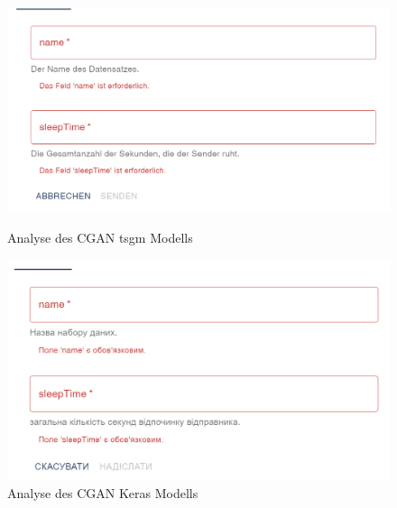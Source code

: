 \begin{figure}[ht]
    \centering
    \begin{minipage}{0.5\textwidth}
        \centering
        \includegraphics[width=\textwidth]{includes/figures/new_version/rsjf_translation_1.png}
        \caption{Analyse des CGAN tsgm Modells}
        \label{fig:rsjf_translation_1}
    \end{minipage}\hfill
    \begin{minipage}{0.5\textwidth}
        \centering
        \includegraphics[width=\textwidth]{includes/figures/new_version/rsjf_translation_2.png}
        \caption{Analyse des CGAN Keras Modells}
        \label{fig:rsjf_translation_2}
    \end{minipage}
\end{figure}